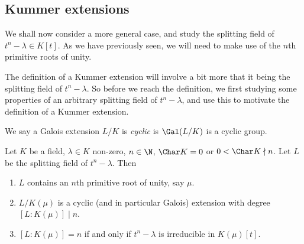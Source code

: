 \documentclass[a4paper]{article}
\begin{document}
\subsection{Kummer extensions}
We shall now consider a more general case, and study the splitting field of $t^n - \lambda \in K[t]$. As we have previously seen, we will need to make use of the $n$th primitive roots of unity.

The definition of a Kummer extension will involve a bit more that it being the splitting field of $t^n - \lambda$. So before we reach the definition, we first studying some properties of an arbitrary splitting field of $t^n - \lambda$, and use this to motivate the definition of a Kummer extension.

\begin{defi}
  We say a Galois extension $L/K$ is \emph{cyclic} is $\Gal(L/K)$ is a cyclic group.
\end{defi}

\begin{thm}
  Let $K$ be a field, $\lambda \in K$ non-zero, $n \in \N$, $\Char K = 0$ or $0 < \Char K \nmid n$. Let $L$ be the splitting field of $t^n - \lambda$. Then
  \begin{enumerate}
    \item $L$ contains an $n$th primitive root of unity, say $\mu$.
    \item $L/K(\mu)$ is a cyclic (and in particular Galois) extension with degree $[L:K(\mu)] \mid n$.
    \item $[L:K(\mu)] = n$ if and only if $t^n - \lambda$ is irreducible in $K(\mu)[t]$.
  \end{enumerate}
\end{thm}
\end{document}
